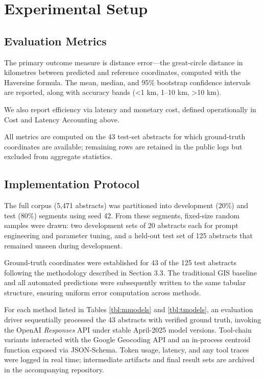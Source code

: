 \section{Experimental Setup}\label{experimental-setup}

\subsection{Evaluation Metrics}\label{evaluation-metrics}

The primary outcome measure is distance error---the great-circle
distance in kilometres between predicted and reference coordinates,
computed with the Haversine formula. The mean, median, and 95\%
bootstrap confidence intervals are reported, along with accuracy bands
(\textless1 km, 1--10 km, \textgreater10 km).

We also report efficiency via latency and monetary cost, defined
operationally in Cost and Latency Accounting above.

All metrics are computed on the 43 test-set abstracts for which
ground-truth coordinates are available; remaining rows are retained in
the public logs but excluded from aggregate statistics.

\subsection{Implementation Protocol}\label{implementation-protocol}

The full corpus (5,471 abstracts) was partitioned into development
(20\%) and test (80\%) segments using seed 42. From these segments,
fixed-size random samples were drawn: two development sets of 20
abstracts each for prompt engineering and parameter tuning, and a
held-out test set of 125 abstracts that remained unseen during
development.

Ground-truth coordinates were established for 43 of the 125 test
abstracts following the methodology described in Section 3.3. The
traditional GIS baseline and all automated predictions were subsequently
written to the same tabular structure, ensuring uniform error
computation across methods.

For each method listed in Tables \ref{tbl:mmodels} and
\ref{tbl:tmodels}, an evaluation driver sequentially processed the 43
abstracts with verified ground truth, invoking the OpenAI
\emph{Responses} API under stable April-2025 model versions. Tool-chain
variants interacted with the Google Geocoding API and an in-process
centroid function exposed via JSON-Schema. Token usage, latency, and any
tool traces were logged in real time; intermediate artifacts and final
result sets are archived in the accompanying repository.

